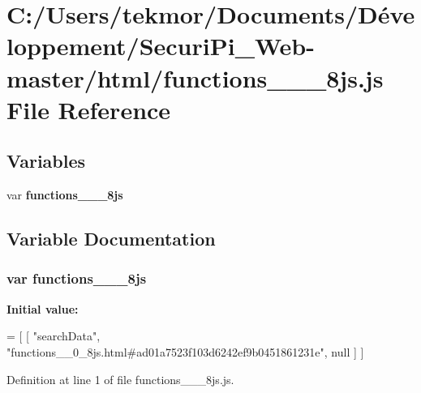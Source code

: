 \section{C\+:/\+Users/tekmor/\+Documents/\+Développement/\+Securi\+Pi\+\_\+\+Web-\/master/html/functions\+\_\+\+\_\+\_\+8js.js File Reference}
\label{functions____0__8js_8js}
\subsection*{Variables}
\begin{DoxyCompactItemize}
\item 
var {\bf functions\+\_\+\+\_\+\_\+8js}
\end{DoxyCompactItemize}


\subsection{Variable Documentation}
\subsubsection[{functions\+\_\+\+\_\+0\+\_\+8js}]{\setlength{\rightskip}{0pt plus 5cm}var functions\+\_\+\+\_\+\_\+8js}\label{functions____0__8js_8js_a7061f190d260b3255ce8c445de1ff0e4}
{\bfseries Initial value\+:}
\begin{DoxyCode}
=
[
    [ \textcolor{stringliteral}{"searchData"}, \textcolor{stringliteral}{"functions\_\_0\_8js.html#ad01a7523f103d6242ef9b0451861231e"}, null ]
]
\end{DoxyCode}


Definition at line 1 of file functions\+\_\+\+\_\+\_\+8js.\+js.

